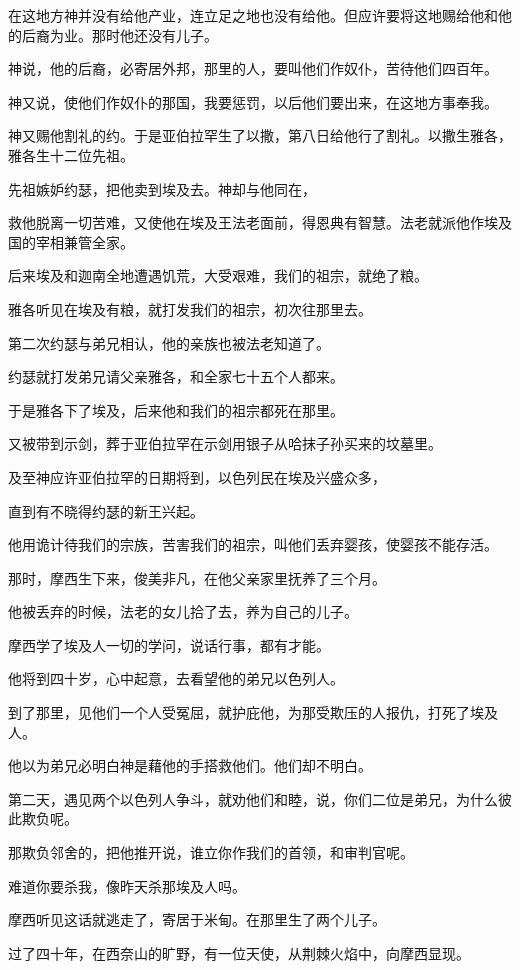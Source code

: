 \documentclass[12pt,oneside]{book}
\begin{document}
在这地方神并没有给他产业，连立足之地也没有给他。但应许要将这地赐给他和他的后裔为业。那时他还没有儿子。

神说，他的后裔，必寄居外邦，那里的人，要叫他们作奴仆，苦待他们四百年。

神又说，使他们作奴仆的那国，我要惩罚，以后他们要出来，在这地方事奉我。

神又赐他割礼的约。于是亚伯拉罕生了以撒，第八日给他行了割礼。以撒生雅各，雅各生十二位先祖。

先祖嫉妒约瑟，把他卖到埃及去。神却与他同在，

救他脱离一切苦难，又使他在埃及王法老面前，得恩典有智慧。法老就派他作埃及国的宰相兼管全家。

后来埃及和迦南全地遭遇饥荒，大受艰难，我们的祖宗，就绝了粮。

雅各听见在埃及有粮，就打发我们的祖宗，初次往那里去。

第二次约瑟与弟兄相认，他的亲族也被法老知道了。

约瑟就打发弟兄请父亲雅各，和全家七十五个人都来。

于是雅各下了埃及，后来他和我们的祖宗都死在那里。

又被带到示剑，葬于亚伯拉罕在示剑用银子从哈抹子孙买来的坟墓里。

及至神应许亚伯拉罕的日期将到，以色列民在埃及兴盛众多，

直到有不晓得约瑟的新王兴起。

他用诡计待我们的宗族，苦害我们的祖宗，叫他们丢弃婴孩，使婴孩不能存活。

那时，摩西生下来，俊美非凡，在他父亲家里抚养了三个月。

他被丢弃的时候，法老的女儿拾了去，养为自己的儿子。

摩西学了埃及人一切的学问，说话行事，都有才能。

他将到四十岁，心中起意，去看望他的弟兄以色列人。

到了那里，见他们一个人受冤屈，就护庇他，为那受欺压的人报仇，打死了埃及人。

他以为弟兄必明白神是藉他的手搭救他们。他们却不明白。

第二天，遇见两个以色列人争斗，就劝他们和睦，说，你们二位是弟兄，为什么彼此欺负呢。

那欺负邻舍的，把他推开说，谁立你作我们的首领，和审判官呢。

难道你要杀我，像昨天杀那埃及人吗。

摩西听见这话就逃走了，寄居于米甸。在那里生了两个儿子。

过了四十年，在西奈山的旷野，有一位天使，从荆棘火焰中，向摩西显现。
\end{document}
